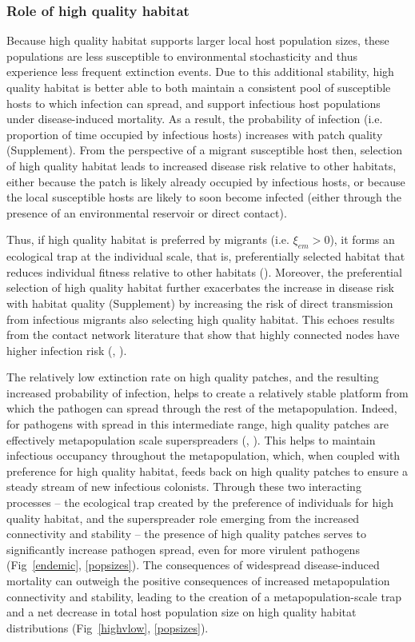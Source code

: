 \documentclass{article}
\begin{document}
\subsubsection*{Role of high quality habitat}

Because high quality habitat supports larger local host population sizes, these populations are less susceptible to environmental stochasticity and thus experience less frequent extinction events.
Due to this additional stability, high quality habitat is better able to both maintain a consistent pool of susceptible hosts to which infection can spread, and support infectious host populations under disease-induced mortality. 
As a result, the probability of infection (i.e. proportion of time occupied by infectious hosts) increases with patch quality (Supplement).
From the perspective of a migrant susceptible host then, selection of high quality habitat leads to increased disease risk relative to other habitats, either because the patch is likely already occupied by infectious hosts, or because the local susceptible hosts are likely to soon become infected (either through the presence of an environmental reservoir or direct contact).

Thus, if high quality habitat is preferred by migrants (i.e. $\xi_{em} > 0$), it forms an ecological trap at the individual scale, that is, preferentially selected habitat that reduces individual fitness relative to other habitats (\cite{Robertson2006}).
Moreover, the preferential selection of high quality habitat further exacerbates the increase in disease risk with habitat quality (Supplement) by increasing the risk of direct transmission from infectious migrants also selecting high quality habitat.
This echoes results from the contact network literature that show that highly connected nodes have higher infection risk (\cite{Christley2005}, \cite{Keeling2005}).

The relatively low extinction rate on high quality patches, and the resulting increased probability of infection, helps to create a relatively stable platform from which the pathogen can spread through the rest of the metapopulation.
Indeed, for pathogens with spread in this intermediate range, high quality patches are effectively metapopulation scale superspreaders (\cite{Lloyd-Smith2005}, \cite{Paull2012}).  
This helps to maintain infectious occupancy throughout the metapopulation, which, when coupled with preference for high quality habitat, feeds back on high quality patches to ensure a steady stream of new infectious colonists. 
Through these two interacting processes -- the ecological trap created by the preference of individuals for high quality habitat, and the superspreader role emerging from the increased connectivity and stability -- the presence of high quality patches serves to significantly increase pathogen spread, even for more virulent pathogens (Fig~\ref{endemic}, \ref{popsizes}).
The consequences of widespread disease-induced mortality can outweigh the positive consequences of increased metapopulation connectivity and stability, leading to the creation of a metapopulation-scale trap and a net decrease in total host population size on high quality habitat distributions (Fig~\ref{highvlow}, \ref{popsizes}).  
\end{document}
